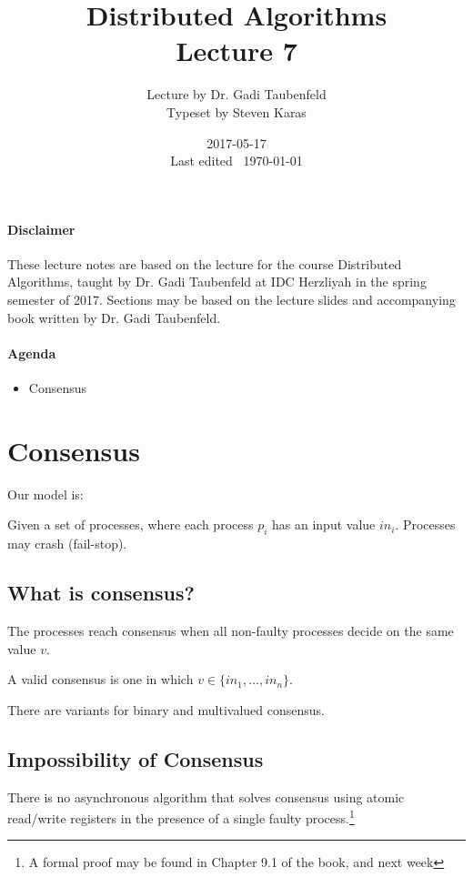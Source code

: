 \documentclass{idc_msc}
\title{Distributed Algorithms\\\large Lecture 7}
\date{2017-05-17 \\ Last edited \currenttime\ \today}
\author{Lecture by Dr. Gadi Taubenfeld\\Typeset by Steven Karas}
\begin{document}
\maketitle

\paragraph{Disclaimer}

These lecture notes are based on the lecture for the course Distributed Algorithms, taught by Dr. Gadi Taubenfeld at IDC Herzliyah in the spring semester of 2017.
Sections may be based on the lecture slides and accompanying book written by Dr. Gadi Taubenfeld.

\paragraph{Agenda}

\begin{itemize}
  \item Consensus
\end{itemize}

\section{Consensus}

Our model is:

Given a set of processes, where each process $p_i$ has an input value $in_i$.
Processes may crash (fail-stop).

\subsection{What is consensus?}

The processes reach consensus when all non-faulty processes decide on the same value $v$.

A valid consensus is one in which $v \in \{in_1,\ldots,in_n\}$.

There are variants for binary and multivalued consensus.

\subsection{Impossibility of Consensus}

There is no asynchronous algorithm that solves consensus using atomic read/write registers in the presence of a single faulty process.\footnote{A formal proof may be found in Chapter 9.1 of the book, and next week}
\end{document}

